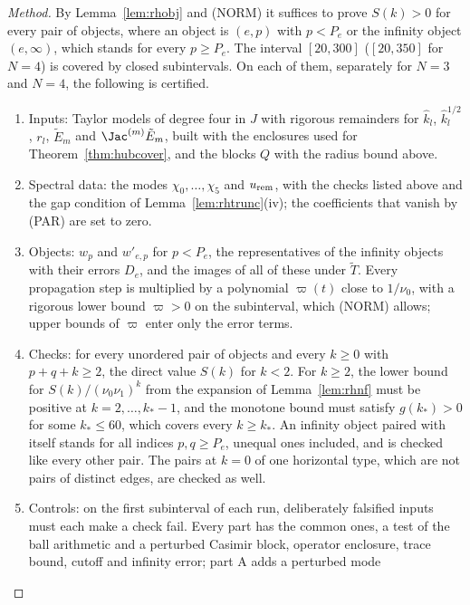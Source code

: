 \begin{proof}[Method]
By Lemma~\ref{lem:rhobj} and (NORM) it suffices to prove $S(k)>0$ for every pair of objects, where an object is $(e,p)$ with $p<P_e$ or the infinity object
$(e,\infty)$, which stands for every $p\ge P_e$. The interval $[20,300]$ ($[20,350]$ for $N=4$) is covered by closed subintervals. On each of them, separately for $N=3$ and
$N=4$, the following is certified.
\begin{enumerate}
\item[(a)] Inputs: Taylor models of degree four in $J$ with rigorous remainders for $\hat k_l$, $\hat k_l^{1/2}$, $r_l$, $\tilde E_m$ and $\Jac^{(m)}\tilde E_m$,
built with the enclosures used for Theorem~\ref{thm:hubcover}, and the blocks $Q$ with the radius bound above.
\item[(b)] Spectral data: the modes $\chi_0,\dots,\chi_5$ and $u_{\rm rem}$, with the checks listed above and the gap condition of
Lemma~\ref{lem:rhtrunc}(iv); the coefficients that vanish by (PAR) are set to zero.
\item[(c)] Objects: $w_p$ and $w'_{e,p}$ for $p<P_e$, the representatives of the infinity objects with their errors $D_e$, and the images of all of these
under $\tilde T$. Every propagation step is multiplied by a polynomial $\varpi(t)$ close to $1/\nu_0$, with a rigorous lower bound $\varpi>0$ on the
subinterval, which (NORM) allows; upper bounds of $\varpi$ enter only the error terms.
\item[(d)] Checks: for every unordered pair of objects and every $k\ge0$ with $p+q+k\ge2$, the direct value $S(k)$ for $k<2$. For $k\ge2$, the lower
bound for $S(k)/(\nu_0\nu_1)^k$ from the expansion of Lemma~\ref{lem:rhnf} must be positive at $k=2,\dots,k_*-1$, and the monotone bound must satisfy
$g(k_*)>0$ for some $k_*\le60$, which covers every $k\ge k_*$. An infinity object paired with itself stands for all indices
$p,q\ge P_e$, unequal ones included, and is checked like every other pair. The pairs at $k=0$ of one horizontal type, which are not pairs of distinct
edges, are checked as well.
\item[(e)] Controls: on the first subinterval of each run, deliberately falsified inputs must each make a check fail. Every part has the common ones, a
test of the ball arithmetic and a perturbed Casimir block, operator enclosure, trace bound, cutoff and infinity error; part A adds a perturbed mode

\end{enumerate}
\end{proof}
